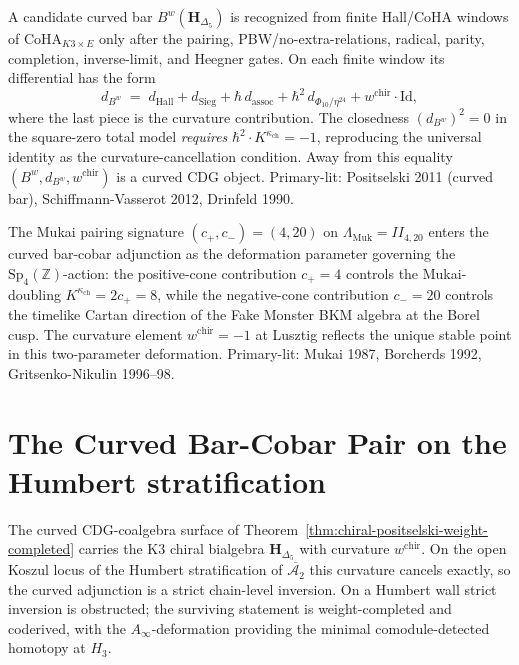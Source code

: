 \begin{remark}
\label{rem:bcac-deep-2}
A candidate curved bar $B^w(\mathbf H_{\Delta_5})$ is recognized from
finite Hall/CoHA windows of $\mathrm{CoHA}_{K3\times E}$ only after the
pairing, PBW/no-extra-relations, radical, parity, completion,
inverse-limit, and Heegner gates. On each finite window its differential
has the form
\[
d_{B^w} \;=\; d_{\mathrm{Hall}} + d_{\mathrm{Sieg}} + \hbar\, d_{\mathrm{assoc}} + \hbar^2\, d_{\Phi_{10}/\eta^{24}} + w^{\mathrm{chir}}\cdot\mathrm{Id},
\]
where the last piece is the curvature contribution. The closedness
$(d_{B^w})^2 = 0$ in the square-zero total model \emph{requires}
$\hbar^2\cdot K^{\kappa_{\mathrm{ch}}} = -1$,
reproducing the universal identity as the curvature-cancellation
condition. Away from this equality $(B^w,d_{B^w},w^{\mathrm{chir}})$
is a curved CDG object. Primary-lit: Positselski 2011 (curved bar),
Schiffmann-Vasserot 2012, Drinfeld 1990.
\end{remark}

\begin{remark}
\label{rem:bcac-deep-3}
The Mukai pairing signature $(c_+,c_-) = (4,20)$ on
$\Lambda_{\mathrm{Muk}} = II_{4,20}$ enters the curved bar-cobar
adjunction as the deformation parameter governing the
$\mathrm{Sp}_4(\mathbb Z)$-action: the positive-cone contribution
$c_+ = 4$ controls the Mukai-doubling $K^{\kappa_{\mathrm{ch}}} = 2c_+ = 8$,
while the negative-cone contribution $c_- = 20$ controls the timelike
Cartan direction of the Fake Monster BKM algebra at the Borel cusp.
The curvature element $w^{\mathrm{chir}} = -1$ at Lusztig reflects
the unique stable point in this two-parameter deformation. Primary-lit:
Mukai 1987, Borcherds 1992, Gritsenko-Nikulin 1996--98.
\end{remark}

\section{The Curved Bar-Cobar Pair on
the Humbert stratification}
\label{sec:bcac-supplement}

The curved CDG-coalgebra surface
of Theorem~\ref{thm:chiral-positselski-weight-completed} carries the
K3 chiral bialgebra $\mathbf{H}_{\Delta_5}$ with curvature
$w^{\mathrm{chir}}$. On the open Koszul locus of the Humbert
stratification of $\overline{\mathcal{A}_2}$ this curvature cancels
exactly, so the curved adjunction is a strict chain-level inversion.
On a Humbert wall strict inversion is obstructed; the surviving
statement is weight-completed and coderived, with the
$A_\infty$-deformation providing the minimal comodule-detected
homotopy at $H_3$.

